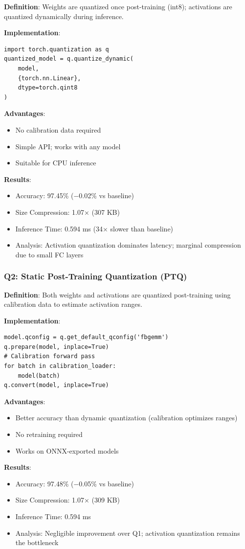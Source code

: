 \documentclass[12pt, a4paper]{article}
\begin{document}
\textbf{Definition}: Weights are quantized once post-training (int8); activations are quantized dynamically during inference.

\textbf{Implementation}:
\begin{lstlisting}
import torch.quantization as q
quantized_model = q.quantize_dynamic(
    model, 
    {torch.nn.Linear}, 
    dtype=torch.qint8
)
\end{lstlisting}

\textbf{Advantages}:
\begin{itemize}
    \item No calibration data required
    \item Simple API; works with any model
    \item Suitable for CPU inference
\end{itemize}

\textbf{Results}:
\begin{itemize}
    \item Accuracy: 97.45\% (−0.02\% vs baseline)
    \item Size Compression: 1.07× (307 KB)
    \item Inference Time: 0.594 ms (34× slower than baseline)
    \item Analysis: Activation quantization dominates latency; marginal compression due to small FC layers
\end{itemize}

\subsubsection{Q2: Static Post-Training Quantization (PTQ)}

\textbf{Definition}: Both weights and activations are quantized post-training using calibration data to estimate activation ranges.

\textbf{Implementation}:
\begin{lstlisting}
model.qconfig = q.get_default_qconfig('fbgemm')
q.prepare(model, inplace=True)
# Calibration forward pass
for batch in calibration_loader:
    model(batch)
q.convert(model, inplace=True)
\end{lstlisting}

\textbf{Advantages}:
\begin{itemize}
    \item Better accuracy than dynamic quantization (calibration optimizes ranges)
    \item No retraining required
    \item Works on ONNX-exported models
\end{itemize}
\newpage
\textbf{Results}:
\begin{itemize}
    \item Accuracy: 97.48\% (−0.05\% vs baseline)
    \item Size Compression: 1.07× (309 KB)
    \item Inference Time: 0.594 ms
    \item Analysis: Negligible improvement over Q1; activation quantization remains the bottleneck
\end{itemize}
\end{document}
